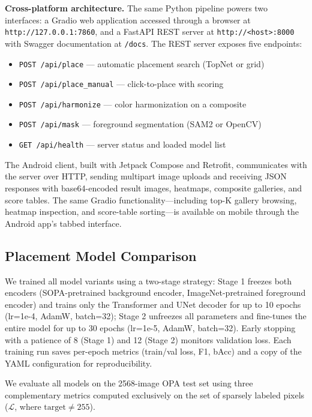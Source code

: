 \documentclass[10pt,twocolumn]{article}
\begin{document}
\textbf{Cross-platform architecture.} The same Python pipeline powers two interfaces: a Gradio web application accessed through a browser at \texttt{http://127.0.0.1:7860}, and a FastAPI REST server at \texttt{http://<host>:8000} with Swagger documentation at \texttt{/docs}. The REST server exposes five endpoints:

\begin{itemize}
    \item \texttt{POST /api/place} — automatic placement search (TopNet or grid)
    \item \texttt{POST /api/place\_manual} — click-to-place with scoring
    \item \texttt{POST /api/harmonize} — color harmonization on a composite
    \item \texttt{POST /api/mask} — foreground segmentation (SAM2 or OpenCV)
    \item \texttt{GET /api/health} — server status and loaded model list
\end{itemize}

The Android client, built with Jetpack Compose and Retrofit, communicates with the server over HTTP, sending multipart image uploads and receiving JSON responses with base64-encoded result images, heatmaps, composite galleries, and score tables. The same Gradio functionality---including top-K gallery browsing, heatmap inspection, and score-table sorting---is available on mobile through the Android app's tabbed interface.

\subsection{Placement Model Comparison}

We trained all model variants using a two-stage strategy: Stage 1 freezes both encoders (SOPA-pretrained background encoder, ImageNet-pretrained foreground encoder) and trains only the Transformer and UNet decoder for up to 10 epochs (lr=1e-4, AdamW, batch=32); Stage 2 unfreezes all parameters and fine-tunes the entire model for up to 30 epochs (lr=1e-5, AdamW, batch=32). Early stopping with a patience of 8 (Stage 1) and 12 (Stage 2) monitors validation loss. Each training run saves per-epoch metrics (train/val loss, F1, bAcc) and a copy of the YAML configuration for reproducibility.

We evaluate all models on the 2568-image OPA test set using three complementary metrics computed exclusively on the set of sparsely labeled pixels ($\mathcal{L}$, where $\text{target} \neq 255$).
\end{document}
